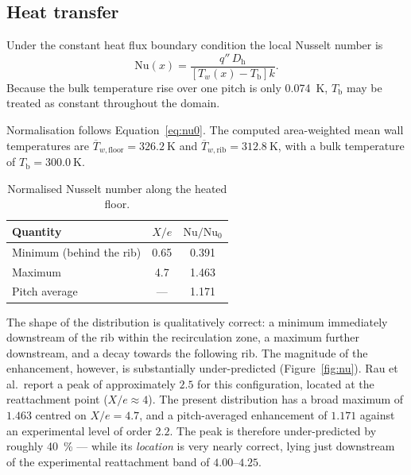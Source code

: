 \documentclass[11pt,a4paper]{article}
\newcommand{\Dh}{D_{\mathrm{h}}}
\newcommand{\Nuss}{\mathrm{Nu}}
\newcommand{\Tb}{T_{\mathrm{b}}}
\begin{document}
\subsection{Heat transfer}

Under the constant heat flux boundary condition the local Nusselt number is
\begin{equation}
  \Nuss(x) = \frac{q''\,\Dh}{\left[T_{w}(x) - \Tb\right] k}.
  \label{eq:nu}
\end{equation}
Because the bulk temperature rise over one pitch is only
\SI{0.074}{\kelvin}, $\Tb$ may be treated as constant throughout the domain.

Normalisation follows Equation~\eqref{eq:nu0}. The computed area-weighted
mean wall temperatures are
$\overline{T}_{w,\text{floor}} = \SI{326.2}{\kelvin}$ and
$\overline{T}_{w,\text{rib}} = \SI{312.8}{\kelvin}$, with a bulk temperature
of $\Tb = \SI{300.0}{\kelvin}$.

\begin{table}[htbp]
\centering
\caption{Normalised Nusselt number along the heated floor.}
\label{tab:nu}
\begin{tabular}{lSS}
\toprule
Quantity & {$X/e$} & {$\Nuss/\Nuss_{0}$} \\
\midrule
Minimum (behind the rib) & 0.65 & 0.391 \\
Maximum                  & 4.7  & 1.463 \\
Pitch average            & {---}  & 1.171 \\
\bottomrule
\end{tabular}
\end{table}

The shape of the distribution is qualitatively correct: a minimum
immediately downstream of the rib within the recirculation zone, a maximum
further downstream, and a decay towards the following rib. The magnitude of
the enhancement, however, is substantially under-predicted
(Figure~\ref{fig:nu}). Rau et al.\ report a peak of approximately $2.5$ for
this configuration, located at the reattachment point ($X/e \approx 4$).
The present distribution has a broad maximum of $1.463$ centred on
$X/e = 4.7$, and a pitch-averaged enhancement of $1.171$ against an
experimental level of order $2.2$. The peak is therefore under-predicted by
roughly \SI{40}{\percent} --- while its \emph{location} is very nearly
correct, lying just downstream of the experimental reattachment band of
$4.00$--$4.25$.
\end{document}
